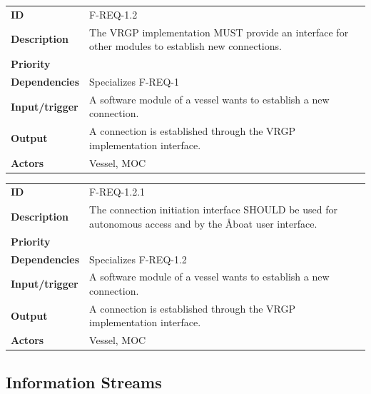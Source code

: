 \begin{table}[H]
	\centering
	\begin{tabularx}{\textwidth}{ l X }
		\rowcolor[HTML]{E7E7E7}
		\textbf{ID} & F-REQ-1.2 \\
		\textbf{Description} & The VRGP implementation MUST provide an interface for other modules to establish new connections.  \\
		\rowcolor[HTML]{E7E7E7}
		\textbf{Priority} & \priohigh \\
		\textbf{Dependencies} & Specializes F-REQ-1 \\
		\rowcolor[HTML]{E7E7E7}
		\textbf{Input/trigger} & A software module of a vessel wants to establish a new connection. \\
		\textbf{Output} & A connection is established through the VRGP implementation interface. \\
		\rowcolor[HTML]{E7E7E7}
		\textbf{Actors} & Vessel, MOC \\
	\end{tabularx}
	\label{table:f-req-1.2}
\end{table}

\begin{table}[H]
	\centering
	\begin{tabularx}{\textwidth}{ l X }
		\rowcolor[HTML]{E7E7E7}
		\textbf{ID} & F-REQ-1.2.1 \\
		\textbf{Description} & The connection initiation interface SHOULD be used for autonomous access and by the Åboat user interface. \\
		\rowcolor[HTML]{E7E7E7}
		\textbf{Priority} & \priohigh \\
		\textbf{Dependencies} & Specializes F-REQ-1.2 \\
		\rowcolor[HTML]{E7E7E7}
		\textbf{Input/trigger} & A software module of a vessel wants to establish a new connection. \\
		\textbf{Output} & A connection is established through the VRGP implementation interface. \\
		\rowcolor[HTML]{E7E7E7}
		\textbf{Actors} & Vessel, MOC \\
	\end{tabularx}
	\label{table:f-req-1.2.1}
\end{table}

\subsection{Information Streams}

